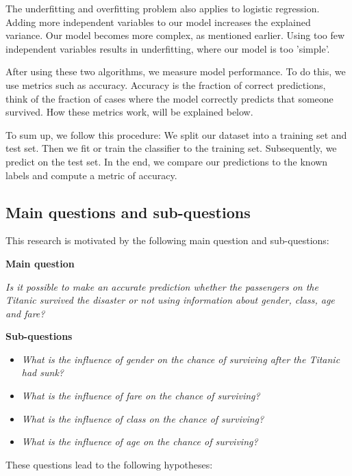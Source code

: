 \documentclass[11pt]{article}
\begin{document}
The underfitting and overfitting problem also applies to logistic regression. Adding more independent variables to our model increases the explained variance. Our model becomes more complex, as mentioned earlier. Using too few independent variables results in underfitting, where our model is too 'simple'. 

After using these two algorithms, we measure model performance. To do this, we use metrics such as accuracy. Accuracy is the fraction of correct predictions, think of the fraction of cases where the model correctly predicts that someone survived. How these metrics work, will be explained below. 

To sum up, we follow this procedure: We split our dataset into a training set and test set. Then we fit or train the classifier to the training set. Subsequently, we predict on the test set. In the end, we compare our predictions to the known labels and compute a metric of accuracy. 

\newpage

\subsection{Main questions and sub-questions}
\label{sec:orga8d349a}
This research is motivated by the following main question and sub-questions: 

\textbf{Main question}

\emph{Is it possible to make an accurate prediction whether the passengers on the Titanic survived the disaster or not using information about gender, class, age and fare?}

\textbf{Sub-questions} 

\begin{itemize}
\item \emph{What is the influence of gender on the chance of surviving after the Titanic had sunk?}
\item \emph{What is the influence of fare on the chance of surviving?}
\item \emph{What is the influence of class on the chance of surviving?}
\item \emph{What is the influence of age on the chance of surviving?}
\end{itemize}

These questions lead to the following hypotheses:
\end{document}
